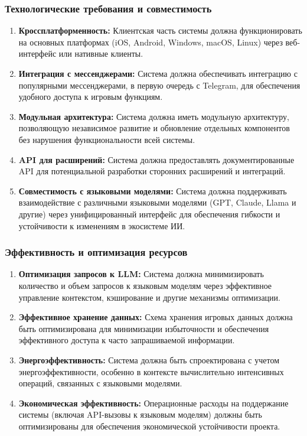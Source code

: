 \subsubsection{Технологические требования и совместимость}

\begin{enumerate}[label=NFR\arabic*., resume]
    \item \textbf{Кроссплатформенность:} Клиентская часть системы должна функционировать на основных платформах (iOS, Android, Windows, macOS, Linux) через веб-интерфейс или нативные клиенты.

    \item \textbf{Интеграция с мессенджерами:} Система должна обеспечивать интеграцию с популярными мессенджерами, в первую очередь с Telegram, для обеспечения удобного доступа к игровым функциям.

    \item \textbf{Модульная архитектура:} Система должна иметь модульную архитектуру, позволяющую независимое развитие и обновление отдельных компонентов без нарушения функциональности всей системы.

    \item \textbf{API для расширений:} Система должна предоставлять документированные API для потенциальной разработки сторонних расширений и интеграций.

    \item \textbf{Совместимость с языковыми моделями:} Система должна поддерживать взаимодействие с различными языковыми моделями (GPT, Claude, Llama и другие) через унифицированный интерфейс для обеспечения гибкости и устойчивости к изменениям в экосистеме ИИ.
\end{enumerate}

\subsubsection{Эффективность и оптимизация ресурсов}

\begin{enumerate}[label=NFR\arabic*., resume]
    \item \textbf{Оптимизация запросов к LLM:} Система должна минимизировать количество и объем запросов к языковым моделям через эффективное управление контекстом, кэширование и другие механизмы оптимизации.

    \item \textbf{Эффективное хранение данных:} Схема хранения игровых данных должна быть оптимизирована для минимизации избыточности и обеспечения эффективного доступа к часто запрашиваемой информации.

    \item \textbf{Энергоэффективность:} Система должна быть спроектирована с учетом энергоэффективности, особенно в контексте вычислительно интенсивных операций, связанных с языковыми моделями.

    \item \textbf{Экономическая эффективность:} Операционные расходы на поддержание системы (включая API-вызовы к языковым моделям) должны быть оптимизированы для обеспечения экономической устойчивости проекта.
\end{enumerate}

